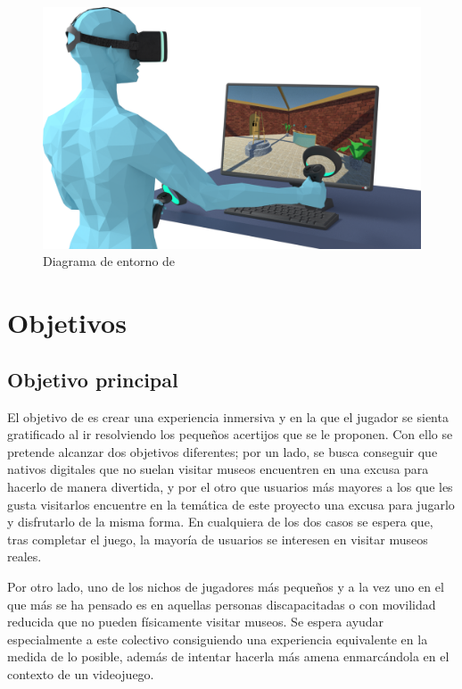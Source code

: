 \begin{figure}[!h]
\begin{center}
\includegraphics[width=1\textwidth]{imagenes/1/entorno-diffuse-2.png}
\caption{Diagrama de entorno de \MineRVa}
\label{fig:entorno}
\end{center}
\end{figure}

\section{Objetivos}

\subsection{Objetivo principal}

El objetivo de \MineRVa es crear una experiencia inmersiva y en la que el jugador se sienta gratificado al ir resolviendo los pequeños acertijos que se le proponen. Con ello se pretende alcanzar dos objetivos diferentes; por un lado, se busca conseguir que nativos digitales que no suelan visitar museos encuentren en \MineRVa una excusa para hacerlo de manera divertida, y por el otro que usuarios más mayores a los que les gusta visitarlos encuentre en la temática de este proyecto una excusa para jugarlo y disfrutarlo de la misma forma. En cualquiera de los dos casos se espera que, tras completar el juego, la mayoría de usuarios se interesen en visitar museos reales.

Por otro lado, uno de los nichos de jugadores más pequeños y a la vez uno en el que más se ha pensado es en aquellas personas discapacitadas o con movilidad reducida que no pueden físicamente visitar museos. Se espera ayudar especialmente a este colectivo consiguiendo una experiencia equivalente en la medida de lo posible, además de intentar hacerla más amena enmarcándola en el contexto de un videojuego.

